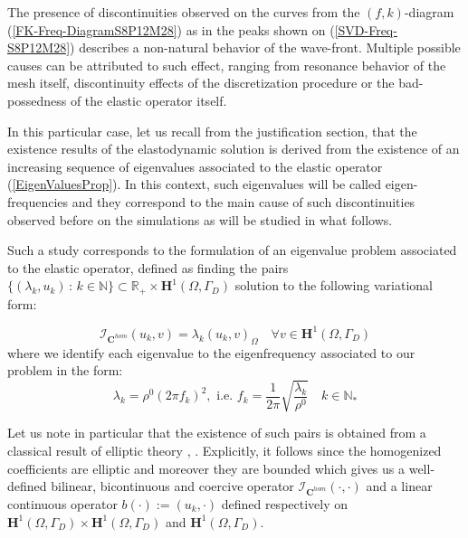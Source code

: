 The presence of discontinuities observed on the curves from  the $(f,k)$-diagram (\ref{FK-Freq-DiagramS8P12M28}) as in the peaks shown on (\ref{SVD-Freq-S8P12M28}) describes a non-natural behavior of the wave-front. Multiple possible causes can be attributed to such effect, ranging from resonance behavior of the mesh itself, discontinuity effects of the discretization procedure or the bad-possedness of the elastic operator itself.

In this particular case, let us recall from the justification section, that the existence results of the elastodynamic solution is derived from the existence of an increasing sequence of eigenvalues associated to the elastic operator (\ref{EigenValuesProp}). In this context, such eigenvalues will be called eigen-frequencies and they correspond to the main cause of such discontinuities observed before on the simulations as will be studied in what follows.

Such a study corresponds to the formulation of an eigenvalue problem associated to the elastic operator, defined as finding the pairs $\{(\lambda_k, u_k) \, : \, k \in \mathbb{N} \} \subset \mathbb{R}_+ \times \mathbf{H}^1(\Omega, \Gamma_D)$ solution to the following variational form:

\begin{equation*}
    \label{VariationalEigenProb}
    \mathcal{I}_{\mathbf{C}^{hom}} (u_k, v) = \lambda_k (u_k, v)_{\Omega} \quad \forall v \in \mathbf{H}^1(\Omega, \Gamma_D)
\end{equation*}
where we identify each eigenvalue to the eigenfrequency associated to our problem in the form:
\begin{equation*}
    \lambda_k = \rho^0 (2\pi f_k)^2, \text{ i.e. } f_k = \frac{1}{2\pi} \sqrt{\frac{\lambda_k}{\rho^0}} \quad k \in \mathbb{N}_{*}
\end{equation*}

\begin{rem}
Let us note in particular that the existence of such pairs is obtained from a classical result of elliptic theory \cite{raviart1983introduction}, \cite{evans2010partial}. Explicitly, it follows since the homogenized coefficients are elliptic and moreover they are bounded which gives us a well-defined bilinear, bicontinuous and coercive operator $\mathcal{I}_{\mathbf{C}^{hom}}(\cdot, \cdot)$ and a linear continuous operator $b(\cdot) := (u_k, \cdot)$ defined respectively on $\mathbf{H}^1(\Omega, \Gamma_D)\times \mathbf{H}^1(\Omega, \Gamma_D)$ and $\mathbf{H}^1(\Omega, \Gamma_D)$.
\end{rem}



